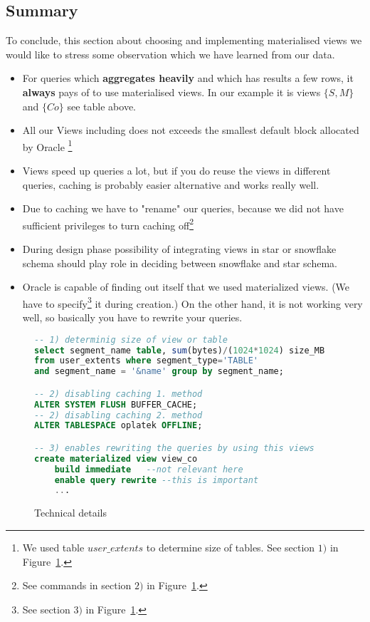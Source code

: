 \subsection*{Summary} 
To conclude, this section about choosing and implementing materialised views we would like to stress some observation
which we have learned from our data.
\begin{itemize}
    \item For queries which {\bf aggregates heavily} and which has results a few rows, it {\bf always} pays of to use materialised views. In our example it is views $\{S,M\}$ and $\{Co\}$ see table above.
    \item All our Views including does not exceeds the smallest default block allocated by Oracle 
        \footnote{We used table $user\_extents$ to determine size of tables. See section $1)$ in Figure~\ref{s:details}.}
    \item Views speed up queries a lot, but if you do reuse the views in different queries,
    caching is probably easier alternative and works really well.
    \item Due to caching we have to "rename" our queries, 
    because we did not have sufficient privileges to turn caching off\footnote{
        See commands in section $2)$ in Figure~\ref{s:details}.}
    \item During design phase possibility of integrating views in star or snowflake schema should play role
    in deciding between snowflake and star schema.
    \item Oracle is capable of finding out itself that we used materialized views. 
    (We have to specify\footnote{See section $3)$ in Figure~\ref{s:details}.} it during creation.)
    On the other hand, it is not working very well, so basically you have to rewrite your queries.
\end{itemize}

\begin{figure}[!hbp]
\begin{center}
\begin{lstlisting}[language=sql] 
-- 1) determinig size of view or table
select segment_name table, sum(bytes)/(1024*1024) size_MB
from user_extents where segment_type='TABLE'
and segment_name = '&name' group by segment_name;

-- 2) disabling caching 1. method
ALTER SYSTEM FLUSH BUFFER_CACHE;
-- 2) disabling caching 2. method
ALTER TABLESPACE oplatek OFFLINE;

-- 3) enables rewriting the queries by using this views
create materialized view view_co 
    build immediate   --not relevant here
    enable query rewrite --this is important
    ...
\end{lstlisting}
\caption{\label{s:details}Technical details}
\end{center}
\end{figure}
